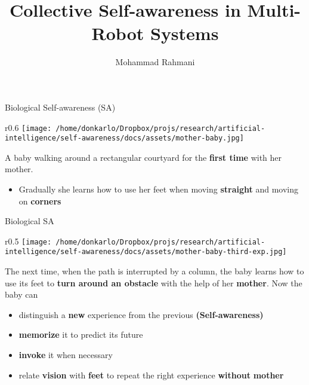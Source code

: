 \documentclass[unknownkeysallowed]{beamer}
\title{Collective Self-awareness in Multi-Robot Systems}
\author{Mohammad Rahmani}
\institute{DECIDE Doctoral School}
\begin{document}
\begin{frame}
	\maketitle
\end{frame}

\begin{frame}{Biological Self-awareness (SA)}
	\begin{wrapfigure}{r}{0.6\textwidth}
		\texttt{[image: /home/donkarlo/Dropbox/projs/research/artificial-intelligence/self-awareness/docs/assets/mother-baby.jpg]} 
	\end{wrapfigure}
	A baby walking around a rectangular courtyard for the \textbf{first time} with her mother.
	\begin{itemize}
		\item Gradually she learns how to use her feet when moving \textbf{straight} and moving on \textbf{corners}
	\end{itemize}
\end{frame}

\begin{frame}{Biological SA}
	\begin{wrapfigure}{r}{0.5\textwidth}
		\texttt{[image: /home/donkarlo/Dropbox/projs/research/artificial-intelligence/self-awareness/docs/assets/mother-baby-third-exp.jpg]} 
	\end{wrapfigure}
	The next time, when the path is interrupted by a column, the baby learns how to use its feet to \textbf{turn around an obstacle} with the help of her \textbf{mother}. Now the baby can
	\begin{itemize}
		\item distinguish a \textbf{new} experience from the previous \textbf{(Self-awareness)}
		\item \textbf{memorize} it to predict its future 
		\item \textbf{invoke} it when necessary
		\item relate \textbf{vision} with \textbf{feet} to repeat the right experience \textbf{without} \textbf{mother}
	\end{itemize} 
\end{frame}
\end{document}
